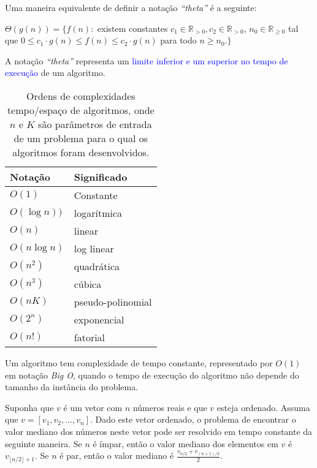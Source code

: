 Uma maneira equivalente de definir a notação \textit{``theta''} é a seguinte:
\vspace{0.3cm}    

\begin{defn}
$\Theta(g(n)) = \{ f(n):$ existem constantes $c_1\in\mathbb{R}_{>0},c_2\in\mathbb{R}_{>0}$, $n_0\in \mathbb{R}_{\geq 0}$ tal que $0 \leq c_1\cdot g(n) \leq f(n) \leq c_2\cdot g(n)$ para todo $n \geq n_0.\}$
\end{defn}\vspace{0.3cm}

A notação \textit{``theta''}  representa um \textcolor{blue}{limite inferior e um superior no tempo de execução} de um algoritmo. 

\begin{table}
    \centering
    \begin{tabular}{l|l}
         Notação     & Significado \\\hline
         $O(1)$      & Constante \\
         $O(\log n))$ & logarítmica\\
         $O(n)$      & linear \\
         $O(n\log n)$ & log linear\\
         $O(n^2)$    & quadrática \\
         $O(n^3)$    & cúbica\\
          $O(nK)$    & pseudo-polinomial\\
         $O(2^n)$    & exponencial \\
         $O(n!)$     & fatorial \\\hline
    \end{tabular}
    \caption{Ordens de complexidades tempo/espaço de algoritmos, onde $n$ e $K$ são parâmetros de entrada de um problema para o qual os algoritmos foram desenvolvidos.}
    \label{tab:my_label}
\end{table}


Um algoritmo tem complexidade de tempo constante, representado por $O(1)$ em notação \textit{Big O}, quando o tempo de execução do algoritmo não depende do tamanho da instância do problema.\vspace{0.2cm}

\begin{exmp}
Suponha que $v$ é um vetor com $n$ números reais e que $v$ esteja ordenado. Assuma que $v=[v_1,v_2,\ldots,v_n]$.  
Dado este vetor ordenado, o problema de encontrar o valor mediano dos números neste vetor pode ser resolvido em tempo constante da seguinte maneira.  
Se $n$ é ímpar, então o valor mediano dos elementos em $v$ é $v_{\lfloor n/2 \rfloor +1}$.  
Se $n$ é par, então o valor mediano é $\frac{v_{n/2} + v_{(n+1)/2}}{2}$.        
\end{exmp}


